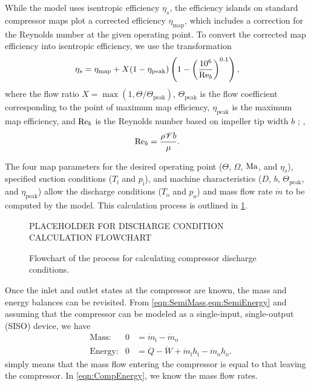 While the model uses isentropic efficiency $\eta_s$, 
the efficiency islands on standard compressor maps plot a corrected efficiency $\eta_{\text{map}}$,
which includes a correction for the Reynolds number at the given operating point.
To convert the corrected map efficiency into isentropic efficiency, 
we use the transformation
\begin{equation}
  \eta_s = \eta_{\text{map}} + X(1 - \eta_{\text{peak}})\left(1-\left(\frac{10^6}{\text{Re}_b}\right)^{0.1}\right),
\end{equation}
where the flow ratio $X = \max{(1,\Theta/\Theta_{\text{peak}})}$, 
$\Theta_{\text{peak}}$ is the flow coefficient 
corresponding to the point of maximum map efficiency,
$\eta_{\text{peak}}$ is the maximum map efficiency,
and $\text{Re}_b$ is the Reynolds number 
based on impeller tip width $b$%
; \eg{},
\begin{equation}
\text{Re}_b=\frac{\rho \mathscr{V} b}{\mu}.
\end{equation}

The four map parameters for the desired operating point 
($\Theta$, $\Omega$, $\text{Ma}$, and $\eta_s$), 
specified suction conditions ($T_{\text{i}}$ and $p_{\text{i}}$), 
and machine characteristics ($D$, $b$, $\Theta_{\text{peak}}$, and $\eta_{\text{peak}}$) 
allow the discharge conditions ($T_{\text{o}}$ and $p_{\text{o}}$) 
and mass flow rate $\dot{m}$ to be computed by the model. 
This calculation process is outlined in \cref{fig:DischargeCalc}.
\begin{figure}[htbp]
  \centering
  PLACEHOLDER FOR DISCHARGE CONDITION CALCULATION FLOWCHART
  \caption{Flowchart of the process for calculating compressor discharge conditions.}
  \label{fig:DischargeCalc}
\end{figure}

Once the inlet and outlet states at the compressor are known, 
the mass and energy balances can be revisited. 
From \cref{eqn:SemiMass,eqn:SemiEnergy} and
 assuming that the compressor can be modeled as a 
single-input, single-output (SISO) device, we have
\begin{align}
  &\text{Mass:}   & 0 &= {\dot{m}_{\text{i}}} - {\dot{m}_{\text{o}}} \label{eqn:CompMass}\\
  &\text{Energy:} & 0 &= \dot{Q} - \dot{W} + {\dot{m}_{\text{i}}h_{\text{i}}} - 
		{\dot{m}_{\text{o}}h_{\text{o}}} \label{eqn:CompEnergy}.
\end{align}
 simply means that the mass flow 
entering the compressor is equal to that leaving the compressor. 
In \cref{eqn:CompEnergy}, we know the mass flow rates. 

